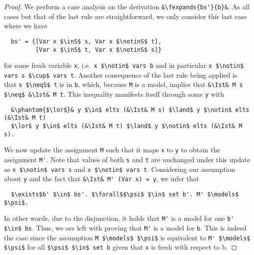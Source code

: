 \documentclass[sigplan,10pt,anonymous,review]{acmart}
\newcommand{\lefttrianglebar}{\mathrel{\tikz[baseline]{\draw (1ex, 0.75ex) -- (0, 1.25ex) -- (0, 0.25ex) -- cycle; \draw (0, 0.75ex) -- (1ex, 0.75ex);}}}
\newcommand{\fexpands}[2]{#1 $\lefttrianglebar$ #2}
\newcommand{\inS}{\in_\text{s}}
\newcommand{\notinS}{\notin_\text{s}}
\newcommand{\neqS}{\neq_\text{s}}
\newcommand{\Ist}{I$_\text{st}$}
\begin{document}
\begin{proof}
  We perform a case analysis on the derivation \lstinline!&\fexpands{bs'}{b}&!.
  As all cases but that of the last rule are straightforward, we only consider this last case where we have 
\begin{lstlisting}
  bs' = {[Var x $\inS$ s, Var x $\notinS$ t],
         [Var x $\inS$ t, Var x $\notinS$ s]}
\end{lstlisting}
  for some fresh variable \lstinline!x!, i.e.\ \lstinline!x $\notin$ vars b! and in particular \lstinline!x $\notin$ vars s $\cup$ vars t!.
  Another consequence of the last rule being applied is that \lstinline!s $\neqS$ t! is in \lstinline!b!, which, because \lstinline!M! is a model, implies that \lstinline!&\Ist& M s $\neq$ &\Ist& M t!.
  This inequality manifests itself through some \lstinline!y! with
\begin{lstlisting}
  &\phantom{$\lor$}& y $\in$ elts (&\Ist& M s) $\land$ y $\notin$ elts (&\Ist& M t)
  $\lor$ y $\in$ elts (&\Ist& M t) $\land$ y $\notin$ elts (&\Ist& M s).
\end{lstlisting}
  We now update the assignment \lstinline!M! such that it maps \lstinline!x! to \lstinline!y! to obtain the assignment \lstinline!M'!.
  Note that values of both \lstinline!s! and \lstinline!t! are unchanged under this update as \lstinline!x $\notin$ vars s! and \lstinline!x $\notin$ vars t!.
  Considering our assumption about \lstinline!y! and the fact that \lstinline!&\Ist& M' (Var x) = y!, we infer that
\begin{lstlisting}
  $\exists$b' $\in$ bs'. $\forall$$\psi$ $\in$ set b'. M' $\models$ $\psi$.
\end{lstlisting}
  In other words, due to the disjunction, it holds that \lstinline!M'! is a model for one \lstinline!b' $\in$ bs!.
  Thus, we are left with proving that \lstinline!M'! is a model for \lstinline!b!.
  This is indeed the case since the assumption \lstinline!M $\models$ $\psi$! is equivalent to \lstinline!M' $\models$ $\psi$! for all \lstinline!$\psi$ $\in$ set b! given that \lstinline!x! is fresh with respect to b.
\end{proof}
\end{document}
